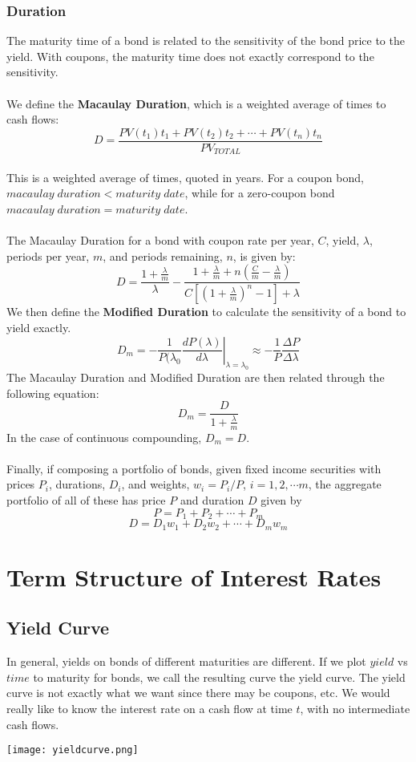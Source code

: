 \documentclass[11pt]{article}
\begin{document}
\subsubsection{Duration}
The maturity time of a bond is related to the sensitivity of the bond price to the yield. With coupons, the maturity time does not exactly correspond to the sensitivity.  \\ \\ We define the \textbf{Macaulay Duration}, which is a weighted average of times to cash flows: \\ \smallskip
$$ D = \frac{PV(t_1)t_1 + PV(t_2)t_2 + \cdots + PV(t_n)t_n  }{PV_{TOTAL}} $$ 
\\
This is a weighted average of times, quoted in years.  For a coupon bond, $macaulay \; duration < maturity \; date$, while for a zero-coupon bond $macaulay \; duration = maturity \; date$.  \\ \\
The Macaulay Duration for a bond with coupon rate per year, $C$, yield, $\lambda$,  periods per year, $m$, and periods remaining, $n$, is given by:
$$D = \frac{1+ \frac{\lambda}{m}}{ \lambda} - \frac{1+\frac{\lambda}{m} + n (\frac{C}{m} - \frac{\lambda}{m}
)}{C[(1+\frac{\lambda}{m})^n -1] + \lambda} $$ 
We then define the \textbf{Modified Duration} to calculate the sensitivity of a bond to yield exactly. $$D_m = - \frac{1}{P(\lambda_0} \left. \frac{dP(\lambda)}{d\lambda} \right|_{\lambda=\lambda_0} \approx - \frac{1}{P} \frac{\Delta P}{\Delta \lambda}$$ 
The Macaulay Duration and Modified Duration are then related through the following equation: 
$$ D_m = \frac{D}{1+\frac{\lambda}{m}}$$
In the case of continuous compounding, $D_m = D$. \\ \\
Finally, if composing a portfolio of bonds, given fixed income securities with prices $P_i$,  durations, $D_i$,  and weights,  $w_i = P_i / P$,  $i = 1,2, \cdots m$, the aggregate portfolio of all of these has price $P$ and duration $D$ given by
$$ P = P_1 + P_2 + \cdots + P_m$$ 
$$ D = D_1w_1 +D_2 w_2+ \cdots + D_mw_m$$ 

\pagebreak

\section{Term Structure of Interest Rates}

\subsection{Yield Curve}
In general, yields on bonds of different maturities are different.  If we plot $yield$ vs $time$ to maturity for bonds, we call the resulting curve the yield curve. The yield curve is not exactly what we want since there may be coupons, etc. We would really like to know the interest rate on a cash flow at time $t$, with no intermediate cash flows.
\begin{center}
\texttt{[image: yieldcurve.png]} 
\end{center}
\end{document}
